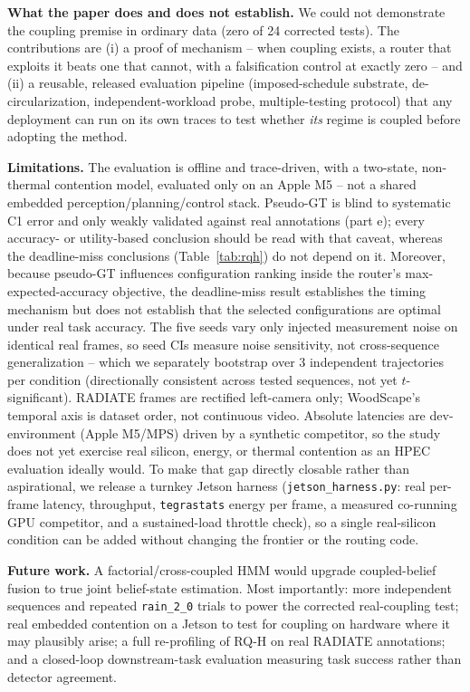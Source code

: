 \documentclass[conference]{IEEEtran}
\begin{document}
\textbf{What the paper does and does not establish.} We could not
demonstrate the coupling premise in ordinary data (zero of 24
corrected tests). The contributions are (i) a proof of mechanism --
when coupling exists, a router that exploits it beats one that
cannot, with a falsification control at exactly zero -- and (ii) a
reusable, released evaluation pipeline (imposed-schedule substrate,
de-circularization, independent-workload probe, multiple-testing
protocol) that any deployment can run on its own traces to test
whether \emph{its} regime is coupled before adopting the method.

\textbf{Limitations.} The evaluation is offline and trace-driven,
with a two-state, non-thermal contention model, evaluated only on an
Apple M5 -- not a shared embedded perception/planning/control stack.
Pseudo-GT is blind to systematic C1 error and only weakly validated
against real annotations (part e); every accuracy- or utility-based
conclusion should be read with that caveat, whereas the deadline-miss
conclusions (Table~\ref{tab:rqh}) do not depend on it. Moreover,
because pseudo-GT influences configuration ranking inside the
router's max-expected-accuracy objective, the deadline-miss result
establishes the timing mechanism but does not establish that the
selected configurations are optimal under real task accuracy.
The five seeds vary only injected measurement noise on identical real
frames, so seed CIs measure noise sensitivity, not cross-sequence
generalization -- which we separately bootstrap over 3 independent
trajectories per condition (directionally consistent across tested
sequences, not yet $t$-significant). RADIATE frames are rectified
left-camera only; WoodScape's temporal axis is dataset order, not
continuous video. Absolute latencies are dev-environment (Apple M5/MPS) driven by a
synthetic competitor, so the study does not yet exercise real silicon,
energy, or thermal contention as an HPEC evaluation ideally would. To
make that gap directly closable rather than aspirational, we release a
turnkey Jetson harness (\texttt{jetson\_harness.py}: real per-frame
latency, throughput, \texttt{tegrastats} energy per frame, a measured
co-running GPU competitor, and a sustained-load throttle check), so a
single real-silicon condition can be added without changing the
frontier or the routing code.

\textbf{Future work.} A factorial/cross-coupled HMM would upgrade
coupled-belief fusion to true joint belief-state estimation. Most
importantly: more independent sequences and repeated
\texttt{rain\_2\_0} trials to power the corrected real-coupling test;
real embedded contention on a Jetson to test for coupling on hardware
where it may plausibly arise; a full re-profiling of RQ-H on real
RADIATE annotations; and a closed-loop downstream-task evaluation
measuring task success rather than detector agreement.
\end{document}
